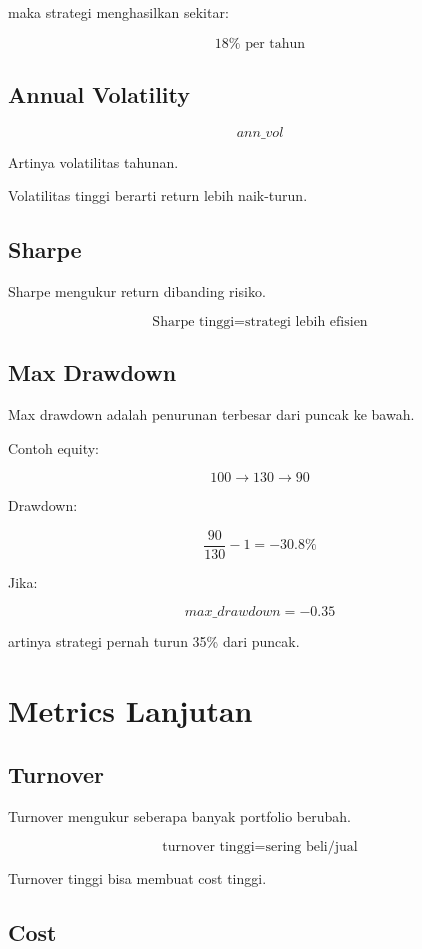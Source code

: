 \documentclass[11pt,a4paper]{article}
\begin{document}
maka strategi menghasilkan sekitar:

\[
18\% \text{ per tahun}
\]

\subsection{Annual Volatility}

\[
ann\_vol
\]

Artinya volatilitas tahunan.

Volatilitas tinggi berarti return lebih naik-turun.

\subsection{Sharpe}

Sharpe mengukur return dibanding risiko.

\[
\boxed{
\text{Sharpe tinggi} = \text{strategi lebih efisien}
}
\]

\subsection{Max Drawdown}

Max drawdown adalah penurunan terbesar dari puncak ke bawah.

Contoh equity:

\[
100 \rightarrow 130 \rightarrow 90
\]

Drawdown:

\[
\frac{90}{130} - 1 = -30.8\%
\]

Jika:

\[
max\_drawdown = -0.35
\]

artinya strategi pernah turun 35\% dari puncak.

\section{Metrics Lanjutan}

\subsection{Turnover}

Turnover mengukur seberapa banyak portfolio berubah.

\[
\boxed{
\text{turnover tinggi} = \text{sering beli/jual}
}
\]

Turnover tinggi bisa membuat cost tinggi.

\subsection{Cost}
\end{document}
